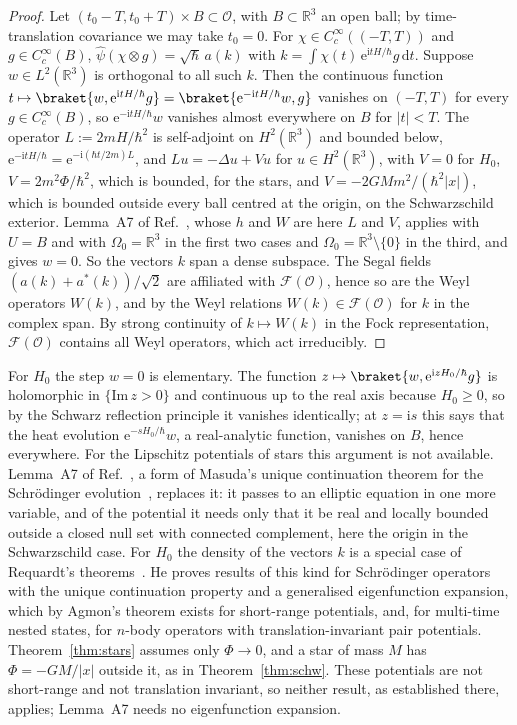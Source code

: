 \documentclass[%
 aip,
 jmp,
 amsmath,amssymb,
 reprint, onecolumn
]{revtex4-1}
\theoremstyle{definition}
\theoremstyle{remark}
\newcommand{\R}{\mathbb{R}}
\newcommand{\F}{\mathcal{F}}
\newcommand{\Op}{\mathcal{O}}
\newcommand{\rmd}{\mathrm{d}}
\newcommand{\rmi}{\mathrm{i}}
\newcommand{\rme}{\mathrm{e}}
\begin{document}
\begin{proof}
Let $(t_0-T,t_0+T)\times B\subset\Op$, with $B\subset\R^3$ an open
ball; by time-translation covariance we may take $t_0=0$. For $\chi\in
C_c^\infty((-T,T))$ and $g\in C_c^\infty(B)$, $\hat\psi(\chi\otimes g)=
\sqrt\hbar\,a(k)$ with $k=\int\chi(t)\,\rme^{\rmi tH/\hbar}g\,\rmd t$.
Suppose $w\in L^2(\R^3)$ is orthogonal to all such $k$. Then the
continuous function $t\mapsto\braket{w,\rme^{\rmi tH/\hbar}g}=
\braket{\rme^{-\rmi tH/\hbar}w,g}$ vanishes on $(-T,T)$ for every $g\in
C_c^\infty(B)$, so $\rme^{-\rmi tH/\hbar}w$ vanishes almost everywhere on
$B$ for $|t|<T$. The operator $L:=2mH/\hbar^2$ is self-adjoint on
$H^2(\R^3)$ and bounded below, $\rme^{-\rmi tH/\hbar}=\rme^{-\rmi(\hbar
t/2m)L}$, and $Lu=-\Delta u+Vu$ for $u\in H^2(\R^3)$, with $V=0$ for
$H_0$, $V=2m^2\Phi/\hbar^2$, which is bounded, for the stars, and $V=
-2GMm^2/(\hbar^2|x|)$, which is bounded outside every ball centred at the
origin, on the Schwarzschild exterior. Lemma~A7 of
Ref.~, whose
$h$ and $W$ are here $L$ and $V$, applies with $U=B$ and with $\Omega_0=
\R^3$ in the first two cases and $\Omega_0=\R^3\setminus\{0\}$ in the
third, and gives $w=0$. So the vectors $k$ span a dense subspace. The Segal fields
$(a(k)+a^*(k))/\sqrt2$ are affiliated with $\F(\Op)$, hence so are the
Weyl operators $W(k)$, and by the Weyl relations $W(k)\in\F(\Op)$ for
$k$ in the complex span. By strong continuity of $k\mapsto W(k)$ in the
Fock representation, $\F(\Op)$ contains all Weyl operators, which act
irreducibly.
\end{proof}

For $H_0$ the step $w=0$ is elementary. The function $z\mapsto
\braket{w,\rme^{\rmi zH_0/\hbar}g}$ is holomorphic in $\{\mathrm{Im}\,
z>0\}$ and continuous up to the real axis because $H_0\geq0$, so by the
Schwarz reflection principle it vanishes identically; at $z=\rmi s$ this
says that the heat evolution $\rme^{-sH_0/\hbar}w$, a real-analytic
function, vanishes on $B$, hence everywhere. For the Lipschitz
potentials of stars this argument is not available. Lemma~A7 of
Ref.~, a form
of Masuda's unique continuation theorem for the Schr\"odinger
evolution~\cite{Masuda1967}, replaces it: it passes to an elliptic
equation in one more variable, and of the potential it needs only that
it be real and locally bounded outside a closed null set with connected
complement, here the origin in the Schwarzschild case. For $H_0$ the
density of the vectors $k$ is a special case of Requardt's
theorems~\cite{Requardt1986}. He proves results of this kind for
Schr\"odinger operators with the unique continuation property and a
generalised eigenfunction expansion, which by Agmon's theorem exists for
short-range potentials, and, for multi-time nested states, for $n$-body
operators with translation-invariant pair potentials.
Theorem~\ref{thm:stars} assumes only $\Phi\to0$, and a star of mass $M$
has $\Phi=-GM/|x|$ outside it, as in Theorem~\ref{thm:schw}. These
potentials are not short-range and not translation invariant, so neither
result, as established there, applies; Lemma~A7 needs no eigenfunction
expansion.
\end{document}
